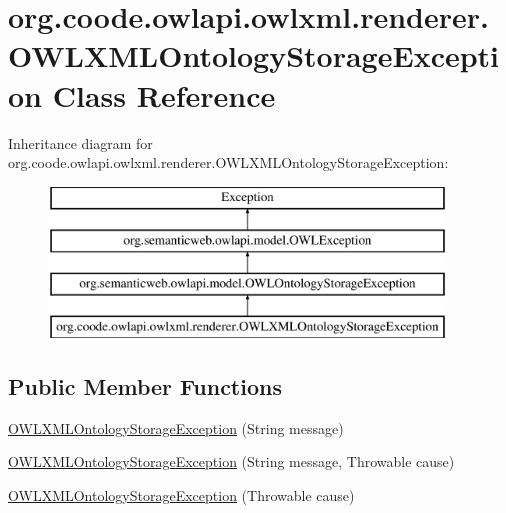 \hypertarget{classorg_1_1coode_1_1owlapi_1_1owlxml_1_1renderer_1_1_o_w_l_x_m_l_ontology_storage_exception}{\section{org.\-coode.\-owlapi.\-owlxml.\-renderer.\-O\-W\-L\-X\-M\-L\-Ontology\-Storage\-Exception Class Reference}
\label{classorg_1_1coode_1_1owlapi_1_1owlxml_1_1renderer_1_1_o_w_l_x_m_l_ontology_storage_exception}
}
Inheritance diagram for org.\-coode.\-owlapi.\-owlxml.\-renderer.\-O\-W\-L\-X\-M\-L\-Ontology\-Storage\-Exception\-:\begin{figure}[H]
\begin{center}
\leavevmode
\includegraphics[height=4.000000cm]{classorg_1_1coode_1_1owlapi_1_1owlxml_1_1renderer_1_1_o_w_l_x_m_l_ontology_storage_exception}
\end{center}
\end{figure}
\subsection*{Public Member Functions}
\begin{DoxyCompactItemize}
\item 
\hyperlink{classorg_1_1coode_1_1owlapi_1_1owlxml_1_1renderer_1_1_o_w_l_x_m_l_ontology_storage_exception_a09eed44f8aba127564782365566ecf9c}{O\-W\-L\-X\-M\-L\-Ontology\-Storage\-Exception} (String message)
\item 
\hyperlink{classorg_1_1coode_1_1owlapi_1_1owlxml_1_1renderer_1_1_o_w_l_x_m_l_ontology_storage_exception_aaa8fea80488d3aadfa5373001531a5d7}{O\-W\-L\-X\-M\-L\-Ontology\-Storage\-Exception} (String message, Throwable cause)
\item 
\hyperlink{classorg_1_1coode_1_1owlapi_1_1owlxml_1_1renderer_1_1_o_w_l_x_m_l_ontology_storage_exception_ab671f4283b5fcc8b7d7eac9e231b0a79}{O\-W\-L\-X\-M\-L\-Ontology\-Storage\-Exception} (Throwable cause)
\end{DoxyCompactItemize}
